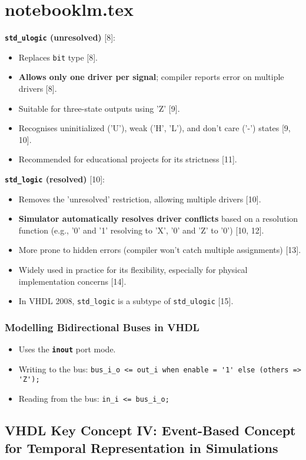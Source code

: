 \section{notebooklm.tex}

\textbf{\texttt{std\_ulogic} (unresolved)} [8]:
\begin{itemize}
    \item Replaces \texttt{bit} type [8].
    \item \textbf{Allows only one driver per signal}; compiler reports error on multiple drivers [8].
    \item Suitable for three-state outputs using 'Z' [9].
    \item Recognises uninitialized ('U'), weak ('H', 'L'), and don't care ('-') states [9, 10].
    \item Recommended for educational projects for its strictness [11].
\end{itemize}

\textbf{\texttt{std\_logic} (resolved)} [10]:
\begin{itemize}
    \item Removes the 'unresolved' restriction, allowing multiple drivers [10].
    \item \textbf{Simulator automatically resolves driver conflicts} based on a resolution function (e.g., '0' and '1' resolving to 'X', '0' and 'Z' to '0') [10, 12].
    \item More prone to hidden errors (compiler won't catch multiple assignments) [13].
    \item Widely used in practice for its flexibility, especially for physical implementation concerns [14].
    \item In VHDL 2008, \texttt{std\_logic} is a subtype of \texttt{std\_ulogic} [15].
\end{itemize}
\subsubsection{Modelling Bidirectional Buses in VHDL}
\begin{itemize}[leftmargin=1.5em]
    \item Uses the \textbf{\texttt{inout}} port mode.
    \item Writing to the bus: \verb|bus_i_o <= out_i when enable = '1' else (others => 'Z');|
    \item Reading from the bus: \verb|in_i <= bus_i_o;|
\end{itemize}

\subsection{VHDL Key Concept IV: Event-Based Concept for Temporal Representation in Simulations}

